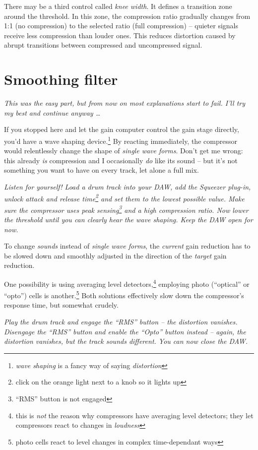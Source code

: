 There may be a third control called \emph{knee width}. It defines a
transition zone around the threshold.  In this zone, the compression
ratio gradually changes from 1:1 (no compression) to the selected
ratio (full compression) -- quieter signals receive less compression
than louder ones.  This reduces distortion caused by abrupt
transitions between compressed and uncompressed signal.

\section{Smoothing filter}
\label{sec:smoothing_filter}

\emph{This was the easy part, but from now on most explanations start
  to fail.  I'll try my best and continue anyway \dots}

If you stopped here and let the gain computer control the gain stage
directly, you'd have a wave shaping device.\footnote{\emph{wave
    shaping} is a fancy way of saying \emph{distortion}} By reacting
immediately, the compressor would relentlessly change the shape of
\emph{single wave forms}.  Don't get me wrong: this already \emph{is}
compression and I occasionally \emph{do} like its sound -- but it's
not something you want to have on every track, let alone a full mix.

\emph{Listen for yourself!  Load a drum track into your DAW, add the
  Squeezer plug-in, unlock attack and release time\footnote{click on
    the orange light next to a knob so it lights up} and set them to
  the lowest possible value.  Make sure the compressor uses peak
  sensing\footnote{``RMS'' button is not engaged} and a high
  compression ratio.  Now lower the threshold until you can clearly
  hear the wave shaping.  Keep the DAW open for now.}

To change \emph{sounds} instead of \emph{single wave forms}, the
\emph{current} gain reduction has to be slowed down and smoothly
adjusted in the direction of the \emph{target} gain reduction.

One possibility is using averaging level detectors,\footnote{this is
  \emph{not} the reason why compressors have averaging level
  detectors; they let compressors react to changes in \emph{loudness}}
employing photo (``optical'' or ``opto'') cells is
another.\footnote{photo cells react to level changes in complex
  time-dependant ways} Both solutions effectively slow down the
compressor's response time, but somewhat crudely.

\emph{Play the drum track and engage the ``RMS'' button -- the
  distortion vanishes.  Disengage the ``RMS'' button and enable the
  ``Opto'' button instead -- again, the distortion vanishes, but the
  track sounds different.  You can now close the DAW.}

